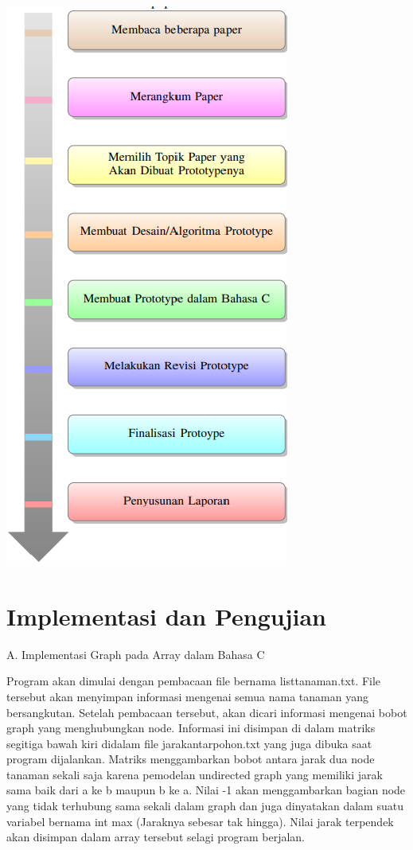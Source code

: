 \documentclass[conference]{IEEEtran}
\begin{document}
\includegraphics[scale=0.73]{tugas0523.jpg}
\section{Implementasi dan Pengujian}
A. Implementasi Graph pada Array dalam Bahasa C\vspace{0.5cm}

Program akan dimulai dengan pembacaan file bernama
listtanaman.txt. File tersebut akan menyimpan informasi mengenai semua nama tanaman yang bersangkutan. Setelah pembacaan tersebut, akan dicari informasi mengenai bobot graph
yang menghubungkan node. Informasi ini disimpan di dalam
matriks segitiga bawah kiri didalam file jarakantarpohon.txt
yang juga dibuka saat program dijalankan. Matriks menggambarkan bobot antara jarak dua node tanaman sekali saja karena
pemodelan undirected graph yang memiliki jarak sama baik
dari a ke b maupun b ke a. Nilai -1 akan menggambarkan
bagian node yang tidak terhubung sama sekali dalam graph
dan juga dinyatakan dalam suatu variabel bernama int max
(Jaraknya sebesar tak hingga). Nilai jarak terpendek akan
disimpan dalam array tersebut selagi program berjalan.\vspace{0.5cm}
\end{document}

